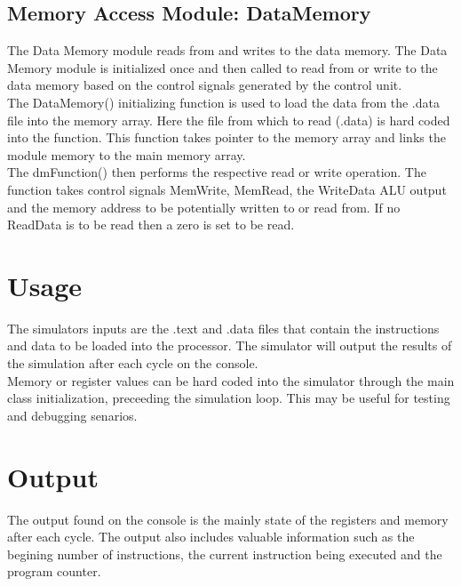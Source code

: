 \documentclass{article}
\begin{document}
\subsection{Memory Access Module: DataMemory}
The Data Memory module reads from and writes to the data memory. The Data Memory module is initialized once and then called to read from or write to the data memory based on the control signals generated by the control unit.\\

The DataMemory() initializing function is used to load the data from the .data file into the memory array. Here the file from which to read (.data) is hard coded into the function. This function takes pointer to the memory array and links the module memory to the main memory array.\\

The dmFunction() then performs the respective read or write operation. The function takes control signals MemWrite, MemRead, the WriteData ALU output and the memory address to be potentially written to or read from. If no ReadData is to be read then a zero is set to be read.\\

\section{Usage}
The simulators inputs are the .text and .data files that contain the instructions and data to be loaded into the processor. The simulator will output the results of the simulation after each cycle on the console.\\

Memory or register values can be hard coded into the simulator through the main class initialization, preceeding the simulation loop. This may be useful for testing and debugging senarios.\\

\section{Output}
The output found on the console is the mainly state of the registers and memory after each cycle. The output also includes valuable information such as the begining number of instructions, the current instruction being executed and the program counter.\\
\end{document}

